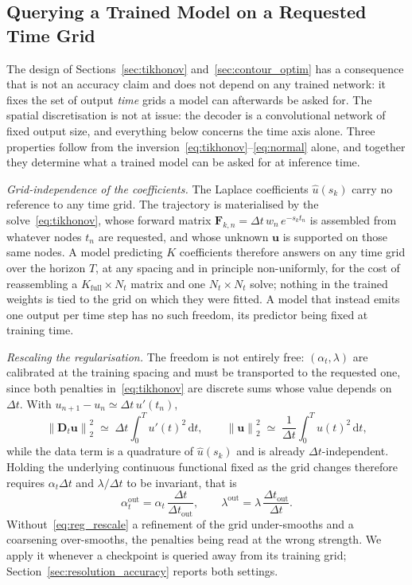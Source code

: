 ﻿\documentclass[a4paper,12pt]{article}
\theoremstyle{definition}
\theoremstyle{remark}
\begin{document}
\subsection{Querying a Trained Model on a Requested Time Grid}
\label{sec:resolution_freedom}

The design of Sections~\ref{sec:tikhonov} and~\ref{sec:contour_optim} has a consequence that is not an accuracy claim and does not depend on any trained network: it fixes the set of output \emph{time} grids a model can afterwards be asked for. The spatial discretisation is not at issue: the decoder is a convolutional network of fixed output size, and everything below concerns the time axis alone. Three properties follow from the inversion~\eqref{eq:tikhonov}--\eqref{eq:normal} alone, and together they determine what a trained model can be asked for at inference time.

\emph{Grid-independence of the coefficients.}
The Laplace coefficients $\hat{u}(s_k)$ carry no reference to any time grid. The trajectory is materialised by the solve~\eqref{eq:tikhonov}, whose forward matrix $\bm{F}_{k,n} = \Delta t\, w_n\, e^{-s_k t_n}$ is assembled from whatever nodes $t_n$ are requested, and whose unknown $\bm{u}$ is supported on those same nodes. A model predicting $K$ coefficients therefore answers on any time grid over the horizon $T$, at any spacing and in principle non-uniformly, for the cost of reassembling a $K_{\mathrm{full}} \times N_t$ matrix and one $N_t \times N_t$ solve; nothing in the trained weights is tied to the grid on which they were fitted. A model that instead emits one output per time step has no such freedom, its predictor being fixed at training time.

\emph{Rescaling the regularisation.}
The freedom is not entirely free: $(\alpha_t, \lambda)$ are calibrated at the training spacing and must be transported to the requested one, since both penalties in~\eqref{eq:tikhonov} are discrete sums whose value depends on $\Delta t$. With $u_{n+1} - u_n \simeq \Delta t\, u'(t_n)$,
\begin{equation}
    \left\|\bm{D}_t\bm{u}\right\|_2^2 \;\simeq\; \Delta t\!\int_0^T \!u'(t)^2\,\mathrm{d}t,
\qquad
    \left\|\bm{u}\right\|_2^2 \;\simeq\; \frac{1}{\Delta t}\!\int_0^T \!u(t)^2\,\mathrm{d}t,
\label{eq:penalty_scaling}
\end{equation}
while the data term is a quadrature of $\hat{u}(s_k)$ and is already $\Delta t$-independent. Holding the underlying continuous functional fixed as the grid changes therefore requires $\alpha_t\Delta t$ and $\lambda/\Delta t$ to be invariant, that is
\begin{equation}
\label{eq:reg_rescale}
    \alpha_t^{\mathrm{out}} = \alpha_t\,\frac{\Delta t}{\Delta t_{\mathrm{out}}},
\qquad
    \lambda^{\mathrm{out}} = \lambda\,\frac{\Delta t_{\mathrm{out}}}{\Delta t}.
\end{equation}
Without~\eqref{eq:reg_rescale} a refinement of the grid under-smooths and a coarsening over-smooths, the penalties being read at the wrong strength. We apply it whenever a checkpoint is queried away from its training grid; Section~\ref{sec:resolution_accuracy} reports both settings.
\end{document}
